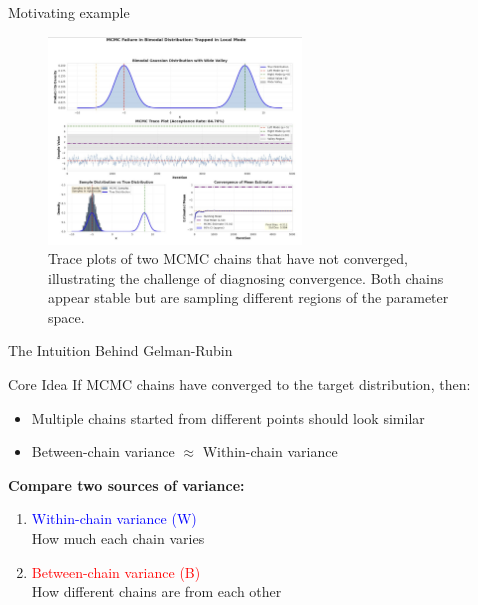 \begin{frame}{Motivating example}
\begin{figure}
	\centering
	\includegraphics[width=0.6\textwidth]{bimodal.jpg}
	\caption{Trace plots of two MCMC chains that have not converged, illustrating the challenge of diagnosing convergence. Both chains appear stable but are sampling different regions of the parameter space.}
\end{figure}
\end{frame}

\begin{frame}{The Intuition Behind Gelman-Rubin}
	\begin{block}{Core Idea}
		If MCMC chains have converged to the target distribution, then:
		\begin{itemize}
			\item Multiple chains started from different points should look similar
			\item Between-chain variance $\approx$ Within-chain variance
		\end{itemize}
	\end{block}

		\textbf{Compare two sources of variance:}
		\begin{enumerate}
			\item \textcolor{blue}{Within-chain variance (W)}\\
					How much each chain varies
			\item \textcolor{red}{Between-chain variance (B)}\\
					How different chains are from each other
		\end{enumerate}
\end{frame}

